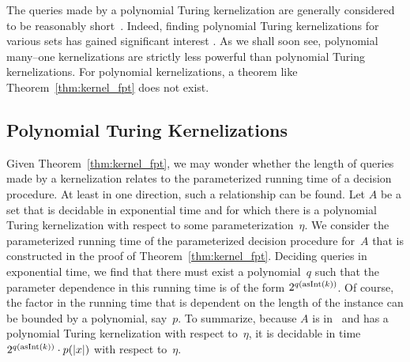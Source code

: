 The queries made by a polynomial Turing kernelization are generally considered to be reasonably short~\parencite{flum2006parameterized}.
Indeed, finding polynomial Turing kernelizations for various sets has gained significant interest \parencite{guo2007invitation,cygan2015parameterized,fomin2019kernelization}.
As we shall soon see, polynomial many--one kernelizations are strictly less powerful than polynomial Turing kernelizations.
For polynomial kernelizations, a theorem like Theorem~\ref{thm:kernel_fpt} does not exist.

\subsection{Polynomial Turing Kernelizations}
\label{sec:redundancy:polynomial}%
Given Theorem~\ref{thm:kernel_fpt}, we may wonder whether the length of queries made by a kernelization relates to the parameterized running time of a decision procedure.
At least in one direction, such a relationship can be found.
Let $A$ be a set that is decidable in exponential time and for which there is a polynomial Turing kernelization with respect to some parameterization~$\eta$.
We consider the parameterized running time of the parameterized decision procedure for~$A$ that is constructed in the proof of Theorem~\ref{thm:kernel_fpt}.
Deciding queries in exponential time, we find that there must exist a polynomial~$q$ such that the parameter dependence in this running time is of the form $2^{q(\operatorname{asInt}(k))}$.
Of course, the factor in the running time that is dependent on the length of the instance can be bounded by a polynomial, say~$p$.
To summarize, because $A$ is in~ and has a polynomial Turing kernelization with respect to~$\eta$, it is decidable in time $2^{q(\operatorname{asInt}(k))} \cdot p({\lvert x\rvert})$ with respect to~$\eta$.

